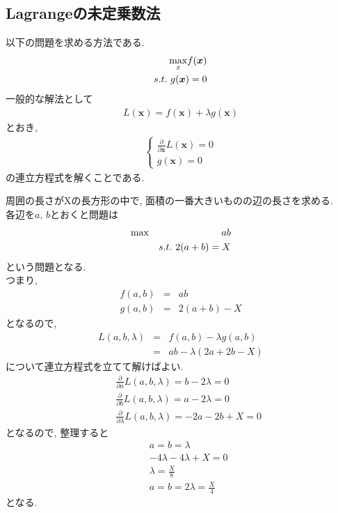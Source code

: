 \documentclass[dvipdfmx,a4j]{jsarticle}
\begin{document}
\subsection{Lagrangeの未定乗数法}
以下の問題を求める方法である.
\begin{eqnarray*}
    \underset{x}{\rm max}f(\bm{x})\\
    s.t.\ g(\bm{x})=0
\end{eqnarray*}
一般的な解法として
\begin{align*}
   L(\bm{x})=f(\bm{x})+\lambda g(\bm{x}) \tag{6.1}
\end{align*}
とおき,
\begin{eqnarray*}
    \left\{
    \begin{array}{l}
      \displaystyle \frac{\partial}{\partial \bm{x}}L(\bm{x}) = 0\\
      g(\bm{x})=0
    \end{array}
    \right.
\end{eqnarray*}
の連立方程式を解くことである.\\
\begin{screen}
周囲の長さがXの長方形の中で, 面積の一番大きいものの辺の長さを求める.\\
各辺を$a,\,b$とおくと問題は
    \begin{eqnarray*}
        {\rm max}&& ab\\
        && s.t.\ 2(a+b)=X
    \end{eqnarray*}
    という問題となる.\\
    つまり, \\
    \begin{eqnarray*}
        f(a,b) &=& ab\\
        g(a,b) &=& 2(a+b)-X
    \end{eqnarray*}
    となるので,
    \begin{eqnarray*}
        L(a,b,\lambda) &=& f(a,b)- \lambda g(a,b)\\
                        &=& ab - \lambda (2a+2b-X)
    \end{eqnarray*}
    について連立方程式を立てて解けばよい.
    \begin{eqnarray*}
        && \frac{\partial}{\partial a} L (a,b,\lambda) = b-2\lambda = 0\\
        && \frac{\partial}{\partial b} L (a,b,\lambda) = a-2\lambda = 0\\
        && \frac{\partial}{\partial \lambda} L(a,b,\lambda) = -2a-2b+X = 0
    \end{eqnarray*}
    となるので, 整理すると
    \begin{eqnarray*}
        && a = b = \lambda\\
        && -4\lambda-4\lambda+X = 0\\
        && \lambda = \frac{X}{8}\\
        && a=b=2\lambda = \frac{X}{4}
    \end{eqnarray*}
となる.
\end{screen}
\end{document}
